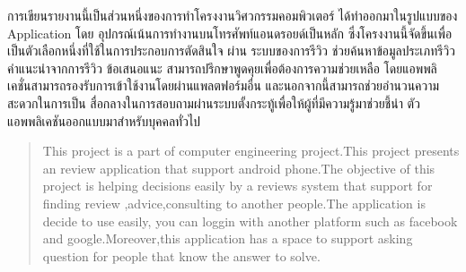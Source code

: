 \maketitle
\makesignature

\ifproject
\begin{abstractTH}
\quad \quad \quad  การเขียนรายงานนี้เป็นส่วนหนึ่งของการทําโครงงานวิศวกรรมคอมพิวเตอร์ ได้ทำออกมาในรูปแบบของ Application โดย
อุปกรณ์เน้นการทำงานบนโทรศัพท์แอนดรอยด์เป็นหลัก ซึ่งโครงงานนี้จัดขึ้นเพื่อเป็นตัวเลือกหนึ่งที่ใช้ในการประกอบการตัดสินใจ ผ่าน
ระบบของการรีวิว ช่วยค้นหาข้อมูลประเภทรีวิว คำแนะนำจากการรีวิว ข้อเสนอแนะ สามารถปรึกษาพูดคุยเพื่อต้องการความช่วยเหลือ
โดยแอพพลิเคชั่นสามารถรองรับการเข้าใช้งานโดยผ่านแพลตฟอร์มอื่น และนอกจากนี้สามารถช่วยอำนวนความสะดวกในการเป็น
สื่อกลางในการสอบถามผ่านระบบตั้งกระทู้เพื่อให้ผู้ที่มีความรู้มาช่วยชี้นำ ตัวแอพพลิเคชันออกแบบมาสำหรับบุคคลทั่วไป
\end{abstractTH}
\renewcommand{\baselinestretch}{2.0}

\begin{abstract}
    \quad \quad \quad  This project is a part of computer engineering project.This project presents an review application that
    support android phone.The objective of this project is helping decisions easily by a reviews system that
    support for finding review ,advice,consulting to another people.The application is decide to use easily, you can 
    loggin with another platform such as facebook and google.Moreover,this application has a space to support asking question for 
    people that know the answer to solve.
\end{abstract}

